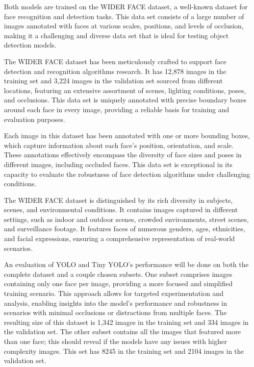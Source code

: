 Both models are trained on the WIDER FACE \cite{yang2016wider} dataset, a well-known dataset for face recognition and detection tasks. This data set consists of a large number of images annotated with faces at various scales, positions, and levels of occlusion, making it a challenging and diverse data set that is ideal for testing object detection models.

The WIDER FACE dataset has been meticulously crafted to support face detection and recognition algorithms research. It has 12,878 images in the training set and 3,224 images in the validation set sourced from different locations, featuring an extensive assortment of scenes, lighting conditions, poses, and occlusions. This data set is uniquely annotated with precise boundary boxes around each face in every image, providing a reliable basis for training and evaluation purposes.

Each image in this dataset has been annotated with one or more bounding boxes, which capture information about each face's position, orientation, and scale. These annotations effectively encompass the diversity of face sizes and poses in different images, including occluded faces. This data set is exceptional in its capacity to evaluate the robustness of face detection algorithms under challenging conditions.

The WIDER FACE dataset is distinguished by its rich diversity in subjects, scenes, and environmental conditions. It contains images captured in different settings, such as indoor and outdoor scenes, crowded environments, street scenes, and surveillance footage. It features faces of numerous genders, ages, ethnicities, and facial expressions, ensuring a comprehensive representation of real-world scenarios.

An evaluation of YOLO and Tiny YOLO's performance will be done on both the complete dataset and a couple chosen subsets. One subset comprises images containing only one face per image, providing a more focused and simplified training scenario. This approach allows for targeted experimentation and analysis, enabling insights into the model's performance and robustness in scenarios with minimal occlusions or distractions from multiple faces. The resulting size of this dataset is 1,342 images in the training set and 334 images in the validation set. The other subset contains all the images that featured more than one face; this should reveal if the models have any issues with higher complexity images. This set has 8245 in the training set and 2104 images in the validation set.

